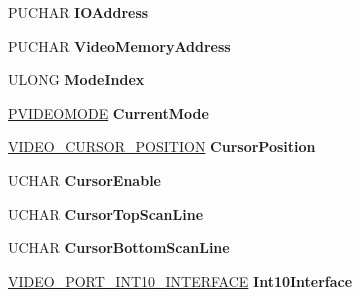 \begin{DoxyCompactItemize}
P\+U\+C\+H\+AR {\bfseries I\+O\+Address}
\item 
\mbox{\label{struct___h_w___d_e_v_i_c_e___e_x_t_e_n_s_i_o_n_a66811f5be887e807b6b1ea80e75187df}} 
P\+U\+C\+H\+AR {\bfseries Video\+Memory\+Address}
\item 
\mbox{\label{struct___h_w___d_e_v_i_c_e___e_x_t_e_n_s_i_o_n_a22dad21b767178e8156ae8a3d0c0c4c9}} 
U\+L\+O\+NG {\bfseries Mode\+Index}
\item 
\mbox{\label{struct___h_w___d_e_v_i_c_e___e_x_t_e_n_s_i_o_n_a315863dd75db3f4eab4312259a800a23}} 
\hyperlink{struct_v_i_d_e_o_m_o_d_e}{P\+V\+I\+D\+E\+O\+M\+O\+DE} {\bfseries Current\+Mode}
\item 
\mbox{\label{struct___h_w___d_e_v_i_c_e___e_x_t_e_n_s_i_o_n_ad01cd64beb96ce2a9e126d4c5220d76e}} 
\hyperlink{struct___v_i_d_e_o___c_u_r_s_o_r___p_o_s_i_t_i_o_n}{V\+I\+D\+E\+O\+\_\+\+C\+U\+R\+S\+O\+R\+\_\+\+P\+O\+S\+I\+T\+I\+ON} {\bfseries Cursor\+Position}
\item 
\mbox{\label{struct___h_w___d_e_v_i_c_e___e_x_t_e_n_s_i_o_n_a8db2dedf2ebfa977ce3339ddc5f8bc05}} 
U\+C\+H\+AR {\bfseries Cursor\+Enable}
\item 
\mbox{\label{struct___h_w___d_e_v_i_c_e___e_x_t_e_n_s_i_o_n_a58a2ace30a861469dd8988283fc3c479}} 
U\+C\+H\+AR {\bfseries Cursor\+Top\+Scan\+Line}
\item 
\mbox{\label{struct___h_w___d_e_v_i_c_e___e_x_t_e_n_s_i_o_n_a9ee9b23d104a94aff5159266a8eada39}} 
U\+C\+H\+AR {\bfseries Cursor\+Bottom\+Scan\+Line}
\item 
\mbox{\label{struct___h_w___d_e_v_i_c_e___e_x_t_e_n_s_i_o_n_ab0883911b89f831a00577ff1a72c0912}} 
\hyperlink{struct___v_i_d_e_o___p_o_r_t___i_n_t10___i_n_t_e_r_f_a_c_e}{V\+I\+D\+E\+O\+\_\+\+P\+O\+R\+T\+\_\+\+I\+N\+T10\+\_\+\+I\+N\+T\+E\+R\+F\+A\+CE} {\bfseries Int10\+Interface}

\end{DoxyCompactItemize}
